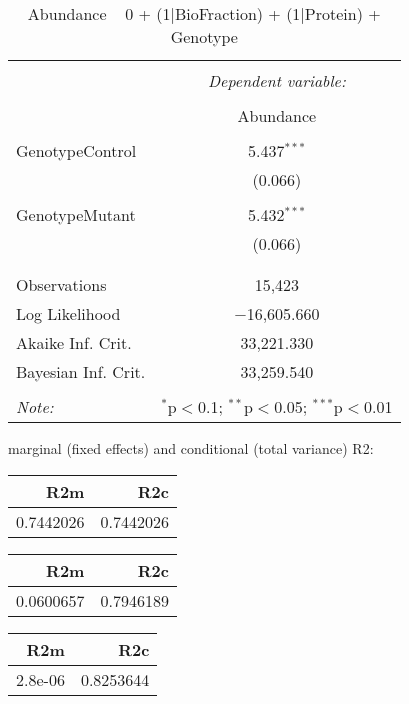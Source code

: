 \documentclass[11pt]{report}
\begin{document}
\begin{table}[!htbp] \centering 
  \caption{Abundance ~ 0 + (1|BioFraction) + (1|Protein) + Genotype} 
  \label{} 
\begin{tabular}{@{\extracolsep{5pt}}lc} 
\\[-1.8ex]\hline 
\hline \\[-1.8ex] 
 & \multicolumn{1}{c}{\textit{Dependent variable:}} \\ 
\cline{2-2} 
\\[-1.8ex] & Abundance \\ 
\hline \\[-1.8ex] 
 GenotypeControl & 5.437$^{***}$ \\ 
  & (0.066) \\ 
  & \\ 
 GenotypeMutant & 5.432$^{***}$ \\ 
  & (0.066) \\ 
  & \\ 
\hline \\[-1.8ex] 
Observations & 15,423 \\ 
Log Likelihood & $-$16,605.660 \\ 
Akaike Inf. Crit. & 33,221.330 \\ 
Bayesian Inf. Crit. & 33,259.540 \\ 
\hline 
\hline \\[-1.8ex] 
\textit{Note:}  & \multicolumn{1}{r}{$^{*}$p$<$0.1; $^{**}$p$<$0.05; $^{***}$p$<$0.01} \\ 
\end{tabular} 
\end{table} 
marginal (fixed effects) and conditional (total variance) R2:

\begin{tabular}{r|r}
\hline
R2m & R2c\\
\hline
0.7442026 & 0.7442026\\
\hline
\end{tabular}

\begin{tabular}{r|r}
\hline
R2m & R2c\\
\hline
0.0600657 & 0.7946189\\
\hline
\end{tabular}

\begin{tabular}{r|r}
\hline
R2m & R2c\\
\hline
2.8e-06 & 0.8253644\\
\hline
\end{tabular}
\end{document}
